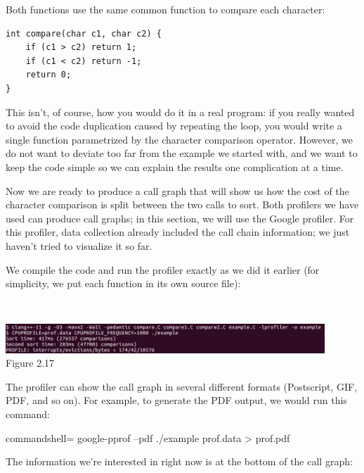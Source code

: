 Both functions use the same common function to compare each character:

\begin{lstlisting}[style=styleCXX]
int compare(char c1, char c2) {
	if (c1 > c2) return 1;
	if (c1 < c2) return -1;
	return 0;
}
\end{lstlisting}

This isn't, of course, how you would do it in a real program: if you really wanted to avoid the code duplication caused by repeating the loop, you would write a single function parametrized by the character comparison operator. However, we do not want to deviate too far from the example we started with, and we want to keep the code simple so we can explain the results one complication at a time.

Now we are ready to produce a call graph that will show us how the cost of the character comparison is split between the two calls to sort. Both profilers we have used can produce call graphs; in this section, we will use the Google profiler. For this profiler, data collection already included the call chain information; we just haven't tried to visualize it so far.

We compile the code and run the profiler exactly as we did it earlier (for simplicity, we put each function in its own source file):

\hspace*{\fill} \\ %
\begin{center}
\includegraphics[width=0.9\textwidth]{content/1/chapter2/images/17.jpg}\\
Figure 2.17
\end{center}

The profiler can show the call graph in several different formats (Postscript, GIF, PDF, and so on). For example, to generate the PDF output, we would run this command:

\begin{tcblisting}{commandshell={}}
google-pprof --pdf ./example prof.data > prof.pdf
\end{tcblisting}

The information we're interested in right now is at the bottom of the call graph: 

